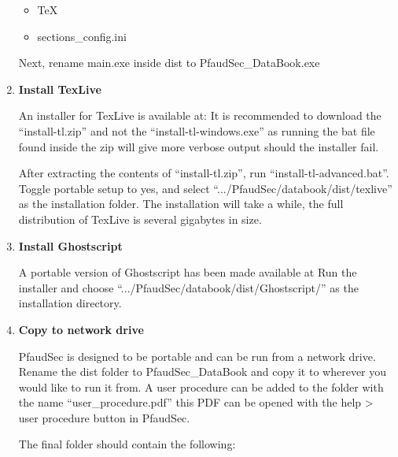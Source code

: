 \documentclass[14pt]{article}
\newcommand{\chref}[3][black]{\href{#2}{\color{#1}{#3}}}%
\newcommand{\ifolder}{\item[\faFolderOpen]}
\newcommand{\ifile}{\item[\faFileText]}
\begin{document}
\begin{flushleft}
\begin{enumerate}
\begin{tcolorbox}[boxrule=0.5pt, colback=backgrey, colframe=bordergrey, sharpish corners] 
\begin{itemize}[labelsep = 1.5em, align=center]%

\ifolder TeX
\ifile sections\_config.ini

\end{itemize}
\end{tcolorbox}

Next, rename main.exe inside dist to PfaudSec\_DataBook.exe

\item \textbf{Install TexLive}

An installer for TexLive is available at:
\chref[pfblue]
{https://www.tug.org/texlive/acquire-netinstall.html}
{https://www.tug.org/texlive/acquire-netinstall.html}
It is recommended to download the
``install-tl.zip'' and not the ``install-tl-windows.exe''
as running the bat file found inside the zip will give more verbose output should the installer fail.

After extracting the contents of ``install-tl.zip'', run ``install-tl-advanced.bat''.
Toggle portable setup to yes, and select ``.../PfaudSec/databook/dist/texlive'' as the installation folder.
The installation will take a while, the full distribution of TexLive is several gigabytes in size.

\item \textbf{Install Ghostscript}

A portable version of Ghostscript has been made available at
\chref[pfblue]
{https://portableapps.com/apps/utilities/ghostscript_portable}
{https://portableapps.com/apps/utilities/ghostscript\_portable}
Run the installer and choose ``.../PfaudSec/databook/dist/Ghostscript/'' as the installation directory.

\item \textbf{Copy to network drive}

PfaudSec is designed to be portable and can be run from a network drive.
Rename the dist folder to PfaudSec\_DataBook and copy it to wherever you would like to run it from.
A user procedure can be added to the folder with the name ``user\_procedure.pdf'' this PDF can be opened with the help > user procedure button in PfaudSec.

The final folder should contain the following:

\begin{tcolorbox}[boxrule=0.5pt, colback=backgrey, colframe=bordergrey, sharpish corners] 


\end{tcolorbox}
\end{enumerate}
\end{flushleft}
\end{document}
